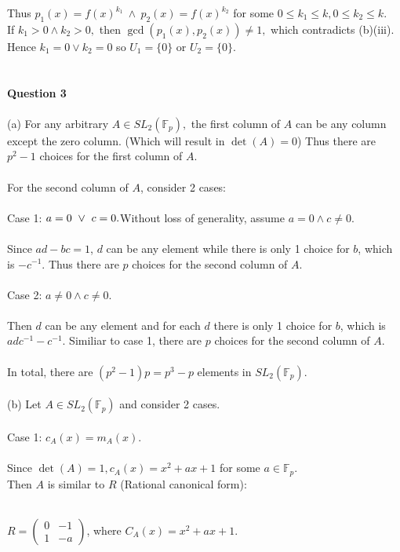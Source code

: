 \documentclass{article}
\begin{document}
Thus $p_1(x) = f(x)^{k_1}\ \land \ p_2(x) = f(x)^{k_2}$ for some $ 0\leq k_1\leq k, 0\leq k_2\leq k.$\\ If $k_1 > 0 \land k_2 > 0,$ then $\gcd(p_1(x),p_2(x)) \neq 1,$ which contradicts (b)(iii). Hence $k_1 = 0 \lor k_2 = 0$ so $U_1 = \{0\}$ or $ U_2 = \{0\}.$\\\\\\
\textbf{Question 3}\\\\
(a) For any arbitrary $A\in SL_2(\mathbb{F}_p), $ the first column of $A$ can be any column except the zero column. (Which will result in $\det(A) = 0$) Thus there are $p^2-1$ choices for the first column of $A$.\\\\
For the second column of $A$, consider 2 cases:\\\\
Case 1: $a = 0\ \lor\ c = 0.\\\\$Without loss of generality, assume $a= 0 \land c \neq 0$.\\\\
Since $ad - bc = 1$, $d$ can be any element while there is only 1 choice for $b$, which is $-c^{-1}.$ Thus there are $p$ choices for the second column of $A$.\\\\
Case 2: $a\neq 0 \land c \neq 0$.\\\\
Then $d$ can be any element and for each $d$ there is only 1 choice for $b$, which is $adc^{-1}-c^{-1}$. Similiar to case 1, there are $p$ choices for the second column of $A.$\\\\
In total, there are $(p^2-1)p = p^3-p$ elements in $SL_2(\mathbb{F}_p)$.\\\\
(b) Let $A\in SL_2(\mathbb{F}_p)$ and consider 2 cases.\\\\
Case 1: $c_A(x) = m_A(x)$.
\\\\
Since $\det(A) = 1, c_A(x) = x^2 + ax + 1$ for some $a\in \mathbb{F}_p$. \\ Then $A$ is similar to $R$ (Rational canonical form):\\\\\begin{center}
$R =
\begin{pmatrix}
0 & -1\\
1 & -a 
\end{pmatrix}$, where $C_A(x) = x^2 +ax+1$.
\end{center}
\end{document}
